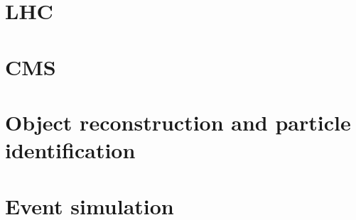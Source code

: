 \section{LHC}
\section{CMS}
\section{Object reconstruction and particle identification}
\section{Event simulation}
